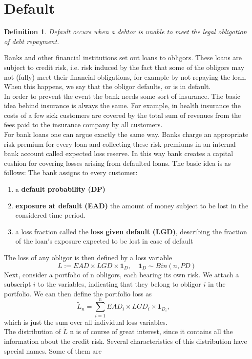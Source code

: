 \documentclass{book}
\newtheorem{definition}{Definition}[section]
\begin{document}
\section{Default}
\begin{definition}
Default occurs when a debtor is unable to meet the legal obligation of debt repayment.
\end{definition}
Banks and other financial institutions set out loans to obligors. These loans are subject to
credit risk, i.e. risk induced by the fact that some of the obligors may not (fully) meet their financial obligations, for example by not repaying the loan. When this happens, we say that the obligor defaults, or is in default.\\
In order to prevent the event the bank needs some sort of insurance. 
The basic idea behind insurance is always the same. For example, in health insurance the costs of a few sick customers are covered by the total sum of revenues from the fees paid to the insurance company by all customers. \\
For bank loans one can argue exactly the same way. Banks charge an appropriate risk premium for every loan and collecting these risk premiums in an internal bank account called expected loss reserve. In this way bank creates a capital cushion for covering losses arising from defaulted loans. 
The basic idea is as follows: The bank assigns to every customer:
\begin{enumerate}
\item a \textbf{default probability (DP)}
\item \textbf{exposure at default (EAD)} the amount of money subject to be lost in the considered time period.
\item a loss fraction called the \textbf{loss given default (LGD)}, describing the fraction of the loan's exposure expected to be lost in case of default
\end{enumerate} 
The loss of any obligor is then defined by a loss variable
$$
L:=EAD\times LGD \times \mathbf{1}_{D},\quad \mathbf{1}_{D}\sim Bin(n,PD)
$$
Next, consider a portfolio of n obligors, each bearing its own risk. We attach a subscript $i$ to
the variables, indicating that they belong to obligor $i$ in the portfolio. We can then define the
portfolio loss as
$$
\tilde{L}_{n}=\sum_{i=1}^{n}EAD_{i}\times LGD_{i}\times \mathbf{1}_{D_{i}},\quad
$$
which is just the sum over all individual loss variables.\\
The distribution of $\tilde{L}$ n is of course of great interest, since it contains all the information about the credit risk. Several characteristics of this distribution have special names. Some of them are
\end{document}
